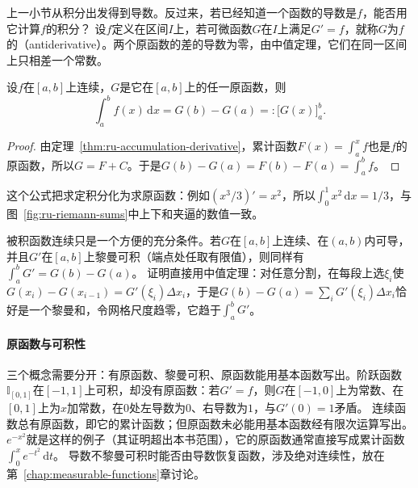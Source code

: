 上一小节从积分出发得到导数。反过来，若已经知道一个函数的导数是$f$，能否用它计算$f$的积分？
设$f$定义在区间$I$上，若可微函数$G$在$I$上满足$G'=f$，就称$G$为$f$的（antiderivative）。两个原函数的差的导数为零，由中值定理，它们在同一区间上只相差一个常数。
\begin{theorem}
\label{thm:ru-newton-leibniz}
设$f$在$[a,b]$上连续，$G$是它在$[a,b]$上的任一原函数，则
\[
 \int_a^bf(x)\,\mathrm dx=G(b)-G(a)=:\bigl[G(x)\bigr]_a^b.
\]
\end{theorem}
\begin{proof}
由定理~\ref{thm:ru-accumulation-derivative}，累计函数$F(x)=\int_a^xf$也是$f$的原函数，所以$G=F+C$。于是$G(b)-G(a)=F(b)-F(a)=\int_a^bf$。
\end{proof}
这个公式把求定积分化为求原函数：例如$(x^3/3)'=x^2$，所以$\int_0^1x^2\,\mathrm dx=1/3$，与图~\ref{fig:ru-riemann-sums}中上下和夹逼的数值一致。

被积函数连续只是一个方便的充分条件。若$G$在$[a,b]$上连续、在$(a,b)$内可导，并且$G'$在$[a,b]$上黎曼可积（端点处任取有限值），则同样有$\int_a^bG'=G(b)-G(a)$。
证明直接用中值定理：对任意分割，在每段上选$\xi_i$使$G(x_i)-G(x_{i-1})=G'(\xi_i)\Delta x_i$，于是$G(b)-G(a)=\sum_iG'(\xi_i)\Delta x_i$恰好是一个黎曼和，令网格尺度趋零，它趋于$\int_a^bG'$。

\paragraph{原函数与可积性}
三个概念需要分开：有原函数、黎曼可积、原函数能用基本函数写出。阶跃函数$\mathbb I_{[0,1]}$在$[-1,1]$上可积，却没有原函数：若$G'=f$，则$G$在$[-1,0]$上为常数、在$[0,1]$上为$x$加常数，在$0$处左导数为$0$、右导数为$1$，与$G'(0)=1$矛盾。
连续函数总有原函数，即它的累计函数；但原函数未必能用基本函数经有限次运算写出。$e^{-x^2}$就是这样的例子（其证明超出本书范围），它的原函数通常直接写成累计函数$\int_0^xe^{-t^2}\,\mathrm dt$。
导数不黎曼可积时能否由导数恢复函数，涉及绝对连续性，放在第~\ref{chap:measurable-functions}章讨论。
